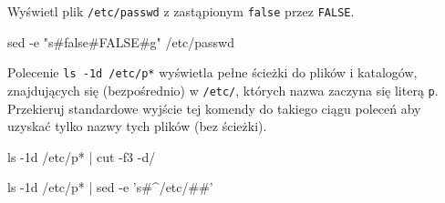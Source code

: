 % 
% 
% 
% 




\dbEntryCheckResults
Wyświetl plik \texttt{/etc/passwd} z zastąpionym \texttt{false} przez \texttt{FALSE}.
\fi
{}\dbEntryCheckResults
\begin{CodeFrame*}[bash]{}
sed -e "s#false#FALSE#g" /etc/passwd
\end{CodeFrame*}
\fi


\dbEntryCheckResults
Polecenie \Verb#ls -1d /etc/p*# wyświetla pełne ścieżki do plików i katalogów, znajdujących się (bezpośrednio) w \texttt{/etc/}, których nazwa zaczyna się literą \texttt{p}.
Przekieruj standardowe wyjście tej komendy do takiego ciągu poleceń aby uzyskać tylko nazwy tych plików (bez ścieżki).
\fi
{}\dbEntryCheckResults
\begin{CodeFrame*}[bash]{}
ls -1d /etc/p* | cut -f3 -d/
\end{CodeFrame*}

\begin{CodeFrame*}[bash]{}
ls -1d /etc/p* | sed -e 's#^/etc/##'
\end{CodeFrame*}

